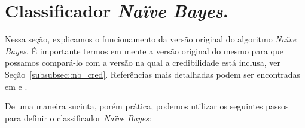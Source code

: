 
\section{Classificador \textit{Naïve Bayes}.}
\label{subsec::cred_nb}



Nessa seção, explicamos o funcionamento da versão original do algoritmo \textit{Naïve Bayes}. É importante termos em mente a versão original do mesmo para que possamos compará-lo com a versão na qual a credibilidade está inclusa, ver Seção~\ref{subsubsec::nb_cred}. Referências mais detalhadas podem ser encontradas em \cite{DHS01} e \cite{Manning08}.

De uma maneira sucinta, porém prática, podemos utilizar os seguintes passos para definir o classificador \textit{Naïve Bayes}:

